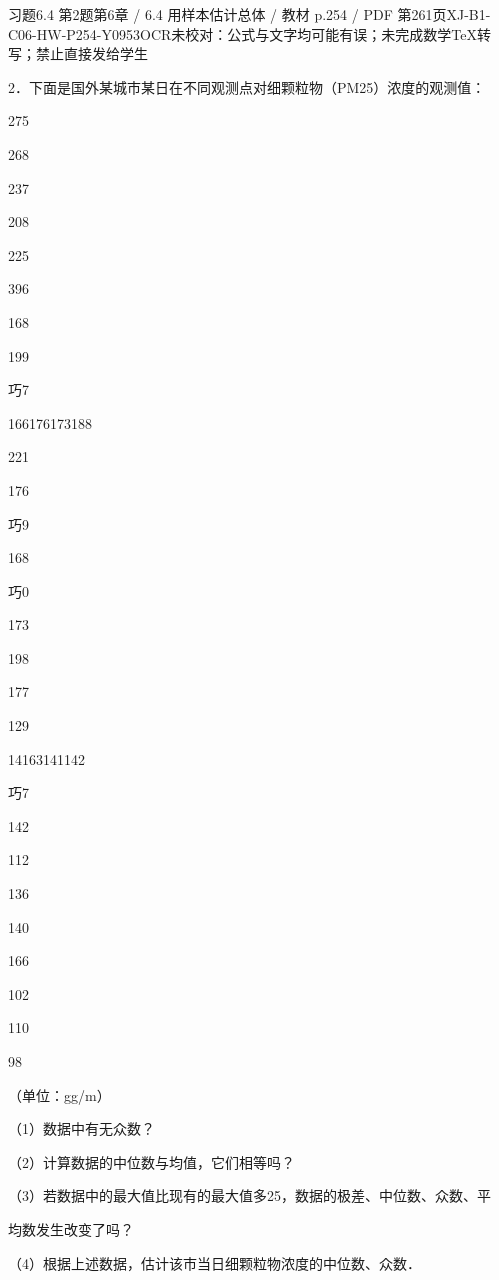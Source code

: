\begin{bankitem}{习题6.4 第2题}{第6章 / 6.4 用样本估计总体 / 教材 p.254 / PDF 第261页}{XJ-B1-C06-HW-P254-Y0953}{OCR未校对：公式与文字均可能有误；未完成数学TeX转写；禁止直接发给学生}
\begin{ocrdraft}
\par
2．下面是国外某城市某日在不同观测点对细颗粒物（PM25）浓度的观测值：
\par
275
\par
268
\par
237
\par
208
\par
225
\par
396
\par
168
\par
199
\par
巧7
\par
166176173188
\par
221
\par
176
\par
巧9
\par
168
\par
巧0
\par
173
\par
198
\par
177
\par
129
\par
14163141142
\par
巧7
\par
142
\par
112
\par
136
\par
140
\par
166
\par
102
\par
110
\par
98
\par
（单位：gg/m）
\par
（1）数据中有无众数？
\par
（2）计算数据的中位数与均值，它们相等吗？
\par
（3）若数据中的最大值比现有的最大值多25，数据的极差、中位数、众数、平
\par
均数发生改变了吗？
\par
（4）根据上述数据，估计该市当日细颗粒物浓度的中位数、众数．
\end{ocrdraft}
\end{bankitem}
